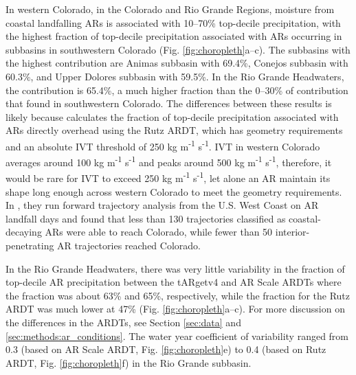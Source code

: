 \documentclass[draft]{agujournal2019}
\begin{document}
In western Colorado, in the Colorado and Rio Grande Regions, moisture from coastal landfalling ARs is associated with 10--70\% top-decile precipitation, with the highest fraction of top-decile precipitation associated with ARs occurring in subbasins in southwestern Colorado (Fig. \ref{fig:choropleth}a--c). The subbasins with the highest contribution are Animas subbasin with 69.4\%, Conejos subbasin with 60.3\%, and Upper Dolores subbasin with 59.5\%. In the Rio Grande Headwaters, the contribution is 65.4\%, a much higher fraction than the 0--30\% of contribution that  found in southwestern Colorado. The differences between these results is likely because  calculates the fraction of top-decile precipitation associated with ARs directly overhead using the Rutz ARDT, which has geometry requirements and an absolute IVT threshold of 250 kg m\textsuperscript{-1} s\textsuperscript{-1}. IVT in western Colorado averages around 100 kg m\textsuperscript{-1} s\textsuperscript{-1} and peaks around 500 kg m\textsuperscript{-1} s\textsuperscript{-1}, therefore, it would be rare for IVT to exceed 250 kg m\textsuperscript{-1} s\textsuperscript{-1}, let alone an AR maintain its shape long enough across western Colorado to meet the geometry requirements. In , they run forward trajectory analysis from the U.S. West Coast on AR landfall days and found that less than 130 trajectories classified as coastal-decaying ARs were able to reach Colorado, while fewer than 50 interior-penetrating AR trajectories reached Colorado.

In the Rio Grande Headwaters, there was very little variability in the fraction of top-decile AR precipitation between the tARgetv4 and AR Scale ARDTs where the fraction was about 63\% and 65\%, respectively, while the fraction for the Rutz ARDT was much lower at 47\% (Fig. \ref{fig:choropleth}a--c). For more discussion on the differences in the ARDTs, see Section \ref{sec:data} and \ref{sec:methods:ar_conditions}. The water year coefficient of variability ranged from 0.3 (based on AR Scale ARDT, Fig. \ref{fig:choropleth}e) to 0.4 (based on Rutz ARDT, Fig. \ref{fig:choropleth}f) in the Rio Grande subbasin.
\end{document}

